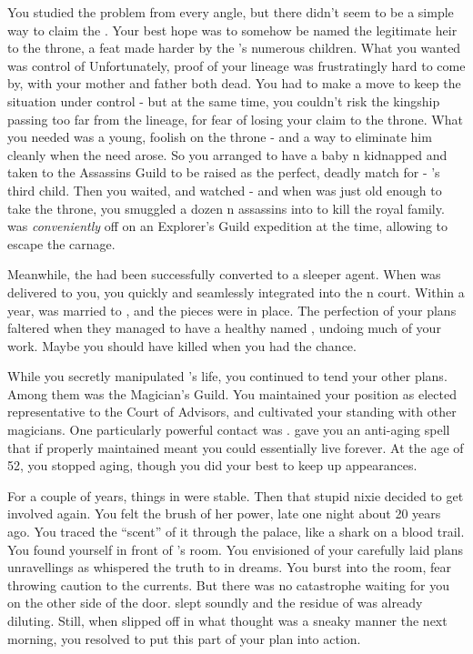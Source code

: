 \documentclass[char]{NeptuneBall}
\begin{document}
You studied the problem from every angle, but there didn't seem to be a simple way to claim the \iTrident{\MYname}. Your best hope was to somehow be named the legitimate heir to the throne, a feat made harder by the \cExKing{\King}'s numerous children. What you wanted was control of \pAtlantis{} Unfortunately, proof of your lineage was frustratingly hard to come by, with your mother and father both dead. You had to make a move to keep the situation under control - but at the same time, you couldn't risk the kingship passing too far from the \cExExKing{} lineage, for fear of losing your claim to the throne. What you needed was a young, foolish \cKing{\King} on the throne - and a way to eliminate him cleanly when the need arose. So you arranged to have a baby \pAtlantis{}n \cQueen{\kid} kidnapped and taken to the Assassins Guild to be raised as the perfect, deadly match for \cKing{} - \cExKing{}'s third child. Then you waited, and watched - and when \cKing{} was just old enough to take the throne, you smuggled a dozen \pPacifica{}n assassins into \pAtlantis{} to kill the royal family. \cKing{} was \emph{conveniently} off on an Explorer's Guild expedition at the time, allowing \cKing{\them} to escape the carnage.

Meanwhile, the \cQueen{\kid} had been successfully converted to a sleeper agent. When \cQueen{} was delivered to you, you quickly and seamlessly integrated \cQueen{\them} into the \pAtlantis{}n court. Within a year, \cKing{} was married to \cQueen{}, and the pieces were in place. The perfection of your plans faltered when they managed to have a healthy \cAriel{\offspring} named \cAriel{}, undoing much of your work. Maybe you should have killed \cKing{} when you had the chance.

While you secretly manipulated \cKing{\King} \cKing{}'s life, you continued to tend your other plans. Among them was the Magician's Guild. You maintained your position as elected representative to the Court of Advisors, and cultivated your standing with other magicians. One particularly powerful contact was \cWitch{}. \cWitch{\They} gave you an anti-aging spell that if properly maintained meant you could essentially live forever. At the age of 52, you stopped aging, though you did your best to keep up appearances.

For a couple of years, things in \pAtlantis{} were stable. Then that stupid nixie decided to get involved again. You felt the brush of her power, late one night about 20 years ago. You traced the ``scent'' of it through the palace, like a shark on a blood trail. You found yourself in front of \cQueen{}'s room. You envisioned of your carefully laid plans unravellings as \cNixie{} whispered the truth to \cQueen{} in dreams. You burst into the room, fear throwing caution to the currents. But there was no catastrophe waiting for you on the other side of the door. \cQueen{} slept soundly and the residue of \cNixie{} was already diluting. Still, when \cQueen{} slipped off in what \cQueen{\they} thought was a sneaky manner the next morning, you resolved to put this part of your plan into action.
\end{document}
